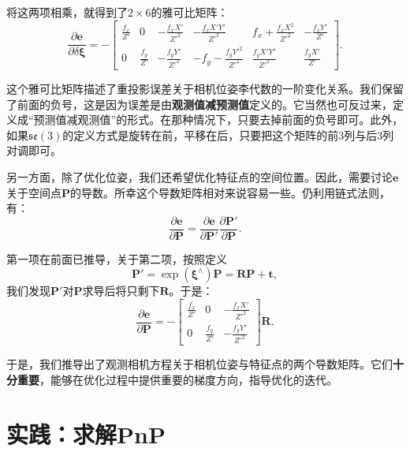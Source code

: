 将这两项相乘，就得到了$2 \times 6$的雅可比矩阵：
\begin{equation}
\label{eq:jacob-uv2xi}
\frac{{\partial \bm{e}}}{{\partial \delta \bm{\xi} }} = - \left[ {\begin{array}{*{20}{c}}
	{\frac{{{f_x}}}{Z'}}&0&{ - \frac{{{f_x}X'}}{{{Z'^2}}}}&{ - \frac{{{f_x}X'Y'}}{{{Z'^2}}}}&{{f_x} + \frac{{{f_x}{X^2}}}{{{Z'^2}}}}&{ - \frac{{{f_x}Y'}}{Z'}}\\
	0&{\frac{{{f_y}}}{Z'}}&{ - \frac{{{f_y}Y'}}{{{Z'^2}}}}&{ - {f_y} - \frac{{{f_y}{Y'^2}}}{{{Z'^2}}}}&{\frac{{{f_y}X'Y'}}{{{Z'^2}}}}&{\frac{{{f_y}X'}}{Z'}}
	\end{array}} \right].
\end{equation}

这个雅可比矩阵描述了重投影误差关于相机位姿李代数的一阶变化关系。我们保留了前面的负号，这是因为误差是由\textbf{观测值减预测值}定义的。它当然也可反过来，定义成“预测值减观测值”的形式。在那种情况下，只要去掉前面的负号即可。此外，如果$\mathfrak{se}(3)$的定义方式是旋转在前，平移在后，只要把这个矩阵的前3列与后3列对调即可。

另一方面，除了优化位姿，我们还希望优化特征点的空间位置。因此，需要讨论$\bm{e}$关于空间点$\bm{P}$的导数。所幸这个导数矩阵相对来说容易一些。仍利用链式法则，有：
\begin{equation}
\frac{{\partial \bm{e}}}{{\partial \bm{P} }} = \frac{{\partial \bm{e}}}{{\partial \bm{P}'}}\frac{{\partial \bm{P}'}}{{\partial \bm{P} }}.
\end{equation}

第一项在前面已推导，关于第二项，按照定义
\[
\bm{P}'=\exp (\bm{\xi}^\wedge) {\bm{P}} = \bm{R} \bm{P} + \bm{t},
\]
我们发现$\bm{P}'$对$\bm{P}$求导后将只剩下$\bm{R}$。于是：
\begin{equation}
\label{eq:jacob-uv2P}
\frac{{\partial \bm{e}}}{{\partial \bm{P} }} = -\left[ 
\begin{array}{*{20}{c}}
	\frac{f_x}{Z'} & 0 &- \frac{f_x X'}{Z'^2} \\
	0 & \frac{f_y}{Z'} & - \frac{f_y Y'}{Z'^2}
\end{array} \right] \bm{R}.
\end{equation}

于是，我们推导出了观测相机方程关于相机位姿与特征点的两个导数矩阵。它们\textbf{十分重要}，能够在优化过程中提供重要的梯度方向，指导优化的迭代。

\section{实践：求解PnP}
